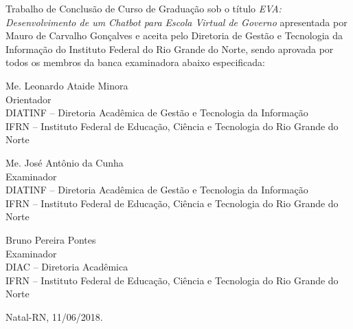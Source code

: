 \begin{folhadeaprovacao}
	\setlength{\ABNTsignthickness}{0.4pt}
	\setlength{\ABNTsignwidth}{10cm}
	
	\noindent 
	Trabalho de Conclusão de Curso de Graduação sob o título
	\textit{EVA: Desenvolvimento de um Chatbot para Escola Virtual de Governo} apresentada por Mauro de Carvalho Gonçalves e aceita pelo Diretoria
	de Gestão e Tecnologia da Informação do Instituto Federal do Rio Grande do
	Norte, sendo aprovada por todos os membros da banca examinadora abaixo especificada:
		
	\assinatura
	{
		Me. Leonardo Ataide Minora   			                  \\
		{\small Orientador}											          \smallskip\\ 
		{\footnotesize
			DIATINF -- Diretoria Acadêmica de Gestão e Tecnologia da Informação		   \\
		  	IFRN -- Instituto Federal de Educação, Ciência e Tecnologia do Rio Grande do Norte
		}
   }
      
   \assinatura
	{
      Me. José Antônio da Cunha   			                  \\
		{\small Examinador}											          \smallskip\\ 
		{\footnotesize
			DIATINF -- Diretoria Acadêmica de Gestão e Tecnologia da Informação		   \\
		  	IFRN -- Instituto Federal de Educação, Ciência e Tecnologia do Rio Grande do Norte
		}
   }   
   
   \assinatura
	{
      Bruno Pereira Pontes 			                  \\
		{\small Examinador}											          \smallskip\\ 
		{\footnotesize
			DIAC -- Diretoria Acadêmica		\\
		  	IFRN -- Instituto Federal de Educação, Ciência e Tecnologia do Rio Grande do Norte
		}
	}
		
	\vfill
	
	\begin{center}
		Natal-RN, 11/06/2018.
	\end{center}
\end{folhadeaprovacao}
